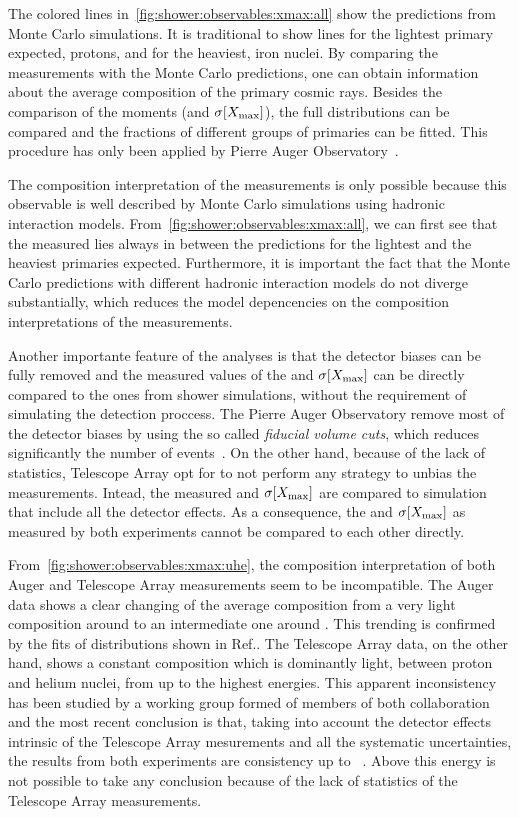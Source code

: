 The colored lines in~\cref{fig:shower:observables:xmax:all}
show the \xmaxmean predictions from
Monte Carlo simulations. It is traditional to show lines for
the lightest primary expected, protons, and for the heaviest, iron nuclei.
By comparing the \xmax measurements with the Monte Carlo predictions,
one can obtain information about the average composition of the primary cosmic rays.
Besides the comparison of the \xmax moments (\xmaxmean and $\sigma[\mbox{$X_\text{max}$}]$),
the full \xmax distributions can be compared and the fractions of different
groups of primaries can be fitted. This procedure has only been applied by Pierre Auger
Observatory~\cite{Aab:2014aea}.

The composition interpretation of the \xmax measurements
is only possible because this observable is well described
by Monte Carlo simulations using hadronic interaction models.
From~\cref{fig:shower:observables:xmax:all},
we can first see that the measured \xmaxmean lies
always in between the predictions for the lightest and the heaviest
primaries expected. Furthermore, it is important the fact that
the Monte Carlo predictions with different hadronic interaction models
do not diverge substantially, which reduces the model depencencies
on the composition interpretations of the measurements.

Another importante feature of the \xmax analyses is
that the detector biases can be fully removed and the measured values
of the \xmaxmean and $\sigma[\mbox{$X_\text{max}$}]$ can be directly compared to
the ones from shower simulations, without the requirement of simulating
the detection proccess. The Pierre Auger Observatory remove most of the
detector biases by using the so called \emph{fiducial volume cuts},
which reduces significantly the number of events~\cite{}.
On the other hand, because of the lack of statistics,
Telescope Array opt for to not perform any strategy to unbias the measurements.
Intead, the measured \xmaxmean and $\sigma[\mbox{$X_\text{max}$}]$ are compared to
simulation that include all the detector effects. As a consequence,
the \xmaxmean and $\sigma[\mbox{$X_\text{max}$}]$ as measured by both experiments cannot
be compared to each other directly.

From~\cref{fig:shower:observables:xmax:uhe}, the composition interpretation
of both Auger and Telescope Array \xmax measurements seem to be incompatible.
The Auger data shows a clear changing of the average composition from a very light
composition around  to an intermediate one around . This trending is confirmed
by the fits of \xmax distributions shown in Ref.\cite{Aab:2014aea}.
The Telescope Array data, on the other hand, shows a constant composition
which is dominantly light, between proton and helium nuclei, from 
up to the highest energies. This apparent inconsistency has been studied
by a working group formed of members of both collaboration and the most recent
conclusion is that, taking into account the detector effects intrinsic of the Telescope Array
mesurements and all the systematic uncertainties, the results from both experiments
are consistency up to ~\cite{VitorICRC2017}.
Above this energy is not possible to take any conclusion
because of the lack of statistics of the Telescope Array measurements. 



